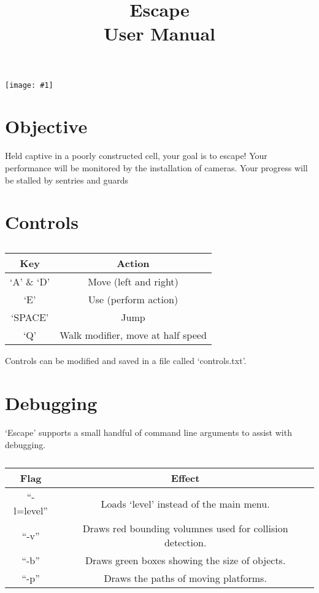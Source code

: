 \documentclass[english]{article}
\title{Escape\\ User Manual}
\author{} %
\date{} %
\def \imgres {1000} %
\def \maximgwidth {0.9\textwidth}     %
\def \maximgheight {0.4\textheight}   %
\newcommand{\sociablyinclude}[1]{\centering\texttt{[image: \#1]}}
\begin{document}
\maketitle
\tableofcontents

\sociablyinclude{screenshot}
\section{Objective}
Held captive in a poorly constructed cell, your goal is to escape!
Your performance will be monitored by the installation of cameras.
Your progress will be stalled by sentries and guards

\section{Controls}
\begin{table}[!h]
\caption*{}
\label{tab:control}
\begin{tabular}{|c|c|}
\hline
Key & Action \\
\hline
`A' \& `D' & Move (left and right) \\
\hline
`E' & Use (perform action) \\
\hline
`SPACE' & Jump \\
\hline
`Q' & Walk modifier, move at half speed \\
\hline
\end{tabular}
\end{table}
Controls can be modified and saved in a file called `controls.txt'.

\section{Debugging}
`Escape' supports a small handful of command line arguments to assist with debugging.

\begin{table}[!h]
\caption*{}
\label{tab:control}
\begin{tabular}{|c|c|}
\hline
Flag & Effect \\
\hline
``-l=level'' & Loads `level' instead of the main menu. \\
\hline
``-v'' & Draws red bounding volumnes used for collision detection. \\
\hline
``-b'' & Draws green boxes showing the size of objects. \\
\hline
``-p'' & Draws the paths of moving platforms. \\
\hline
\end{tabular}
\end{table}
\end{document}
